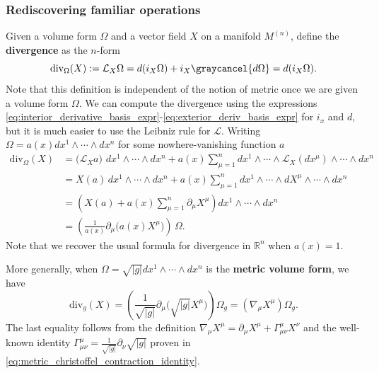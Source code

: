 \subsubsection{Rediscovering familiar operations}

\begin{mytheorem}
Given a volume form $\Omega$ and a vector field $X$ on a manifold $M^{(n)}$, define the \textbf{divergence} as the $n$-form
\begin{equation}
    \mathrm{div}_\Omega (X) := \mathcal{L}_X \Omega = d (i_X \Omega) + i_X \graycancel{d\Omega} = d (i_X \Omega).
\end{equation}
Note that this definition is independent of the notion of metric once we are given a volume form $\Omega$.
We can compute the divergence using the expressions \eqref{eq:interior_derivative_basis_expr}-\eqref{eq:exterior_deriv_basis_expr} for $i_x$ and $d$, but it is much easier to use the Leibniz rule for $\mathcal{L}$.
Writing $\Omega = a(x) dx^1 \wedge \cdots \wedge dx^n$ for some nowhere-vanishing function $a$
\begin{align}
    \mathrm{div}_\Omega (X) 
    &= \big(\mathcal{L}_X a\big)\,\,dx^1 \wedge \cdots \wedge dx^n + a(x) \sum_{\mu=1}^n dx^1 \wedge \cdots \wedge \mathcal{L}_X(dx^\mu) \wedge \cdots \wedge dx^n
    \\&= X(a) \, dx^1 \wedge \cdots \wedge dx^n + a(x) \sum_{\mu=1}^n dx^1 \wedge \cdots \wedge dX^{\mu} \wedge \cdots \wedge dx^n
    \\&= \left( X(a) + a(x) \sum_{\mu=1}^n \partial_{\mu} X^{\mu} \right) dx^1 \wedge \cdots \wedge dx^n 
    \\&= \left( \frac{1}{a(x)} \partial_{\mu} \big(a(x) X^{\mu}\big) \right) \, \Omega.
\end{align}
Note that we recover the usual formula for divergence in $\mathbb{R}^n$ when $a(x) = 1$.
\smallskip

More generally, when $\Omega = \sqrt{|g|} dx^1 \wedge \cdots \wedge dx^n$ is the \textbf{metric volume form}, we have
\begin{equation}
    \mathrm{div}_g (X) = \left( \frac{1}{\sqrt{|g|}} \partial_{\mu} \Big(\sqrt{|g|} X^{\mu}\Big) \right) \Omega_g = \left( \nabla_{\mu} X^{\mu} \right) \Omega_g.
\end{equation}
The last equality follows from the definition $\nabla_{\mu}X^\mu= \partial_\mu X^\mu + \Gamma_{\mu \nu}^\mu X^\nu$ and the well-known identity $\Gamma_{\mu \nu}^\mu = \frac{1}{\sqrt{|g|}} \partial_\nu \sqrt{|g|}$ proven in \eqref{eq:metric_christoffel_contraction_identity}.
\smallskip


\end{mytheorem}
